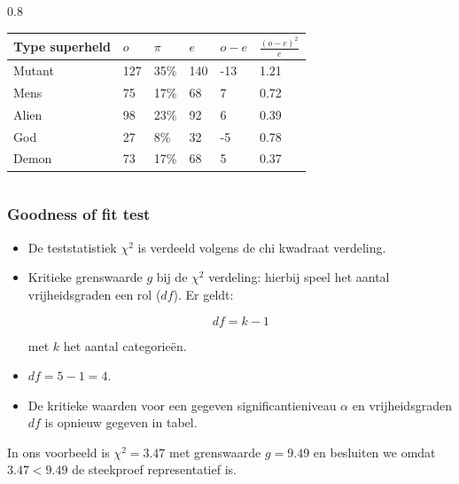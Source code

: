 \documentclass{beamer}
\begin{document}
\begin{frame}
\begin{columns}
    \begin{column} { 0.8 \textwidth}
\begin{table}[h]
\begin{tabular}{@{}llllll@{}}
\toprule
\textbf{Type superheld} & \textbf{$o$} & \textbf{$\pi$} & \textbf{$e$} & \textbf{$o -e$} & \textbf{$\frac{(o-e)^{2}}{e}$} \\ \midrule
Mutant                  & 127          & 35\%           & 140          & -13             & 1.21                           \\
Mens                    & 75           & 17\%           & 68           & 7               & 0.72                           \\
Alien                   & 98           & 23\%           & 92           & 6               & 0.39                           \\
God                     & 27           & 8\%            & 32           & -5              & 0.78                           \\
Demon                   & 73           & 17\%           & 68           & 5               & 0.37                           \\ \bottomrule
\end{tabular}
\end{table}
    \end{column}
  \end{columns}
\end{frame}


\begin{frame}
  \frametitle{Goodness of fit test}

  \begin{itemize}
    \item De teststatistiek $\chi^{2}$ is verdeeld volgens de chi kwadraat verdeling.
    \item Kritieke grenswaarde $g$ bij de $\chi^{2}$ verdeling: hierbij speel het aantal vrijheidsgraden een rol ($df$). Er geldt:

\[ df = k -1 \]

met $k$ het aantal categorie\"en.
\item $df = 5-1 = 4$.
\item De kritieke waarden voor een gegeven significantieniveau $\alpha$ en vrijheidsgraden $df$ is opnieuw gegeven in tabel.
  \end{itemize}
In ons voorbeeld is $\chi^{2} = 3.47$ met grenswaarde $g = 9.49$ en besluiten we omdat $3.47 < 9.49$ de steekproef representatief is.
\end{frame}
\end{document}
